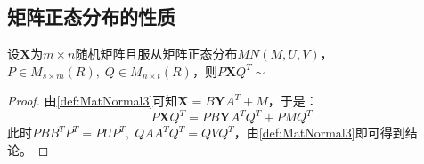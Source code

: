 \subsection{矩阵正态分布的性质}
\begin{theorem}\label{theo:MatNormalLinearTransform}
	设$\mathbf{X}$为$m\times n$随机矩阵且服从矩阵正态分布$MN(M,U,V)$，$P\in M_{s\times m}(R),\;Q\in M_{n\times t}(R)$，则$P\mathbf{X}Q^T\sim$
\end{theorem}
\begin{proof}
	由\cref{def:MatNormal3}可知$\mathbf{X}=B\mathbf{Y}A^T+M$，于是：
	\begin{equation*}
		P\mathbf{X}Q^T=PB\mathbf{Y}A^TQ^T+PMQ^T
	\end{equation*}
	此时$PBB^TP^T=PUP^T,\;QAA^TQ^T=QVQ^T$，由\cref{def:MatNormal3}即可得到结论。
\end{proof}